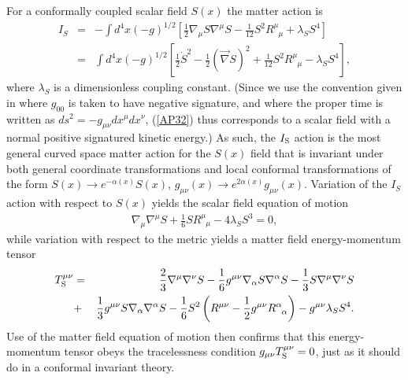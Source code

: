 \documentclass[aps]{revtex4}
\begin{document}
For a conformally coupled scalar field $S(x)$ the matter action is
%                                                                               
\begin{eqnarray}
I_S&=&-\int d^4x(-g)^{1/2}\left[\frac{1}{2}\nabla_{\mu}S
\nabla^{\mu}S-\frac{1}{12}S^2R^\mu_{\phantom         
{\mu}\mu}+\lambda_S S^4\right]
\nonumber\\
&=&\int d^4x(-g)^{1/2}\left[\frac{1}{2}\dot{S}^2-\frac{1}{2}(\vec{\nabla} S)^2
+\frac{1}{12}S^2R^\mu_{\phantom         
{\mu}\mu}-\lambda_S S^4\right],
\label{AP32}
\end{eqnarray}                                 
% 
where  $\lambda_S$ is a dimensionless coupling constant. (Since we use the convention given in  \cite{Weinberg1972} where $g_{00}$ is taken to have negative signature, and where the proper time is written as $ds^2=-g_{\mu\nu}dx^{\mu}dx^{\nu}$, (\ref{AP32}) thus corresponds to a scalar field with a normal positive signatured kinetic energy.) As such, the $I_{\rm S}$ action is the most general curved space matter action for the $S(x)$ field that is invariant under both general coordinate transformations and local conformal transformations of the form
$S(x)\rightarrow e^{-\alpha(x)}S(x)$,  $g_{\mu\nu}(x)\rightarrow e^{2\alpha(x)}g_{\mu\nu}(x)$. Variation of the $I_S$ action with respect to  $S(x)$ yields the scalar field equation of motion
%                                                                               
\begin{eqnarray}
\nabla_{\mu}\nabla^{\mu}S+\frac{1}{6}SR^\mu_{\phantom{\mu}\mu}
-4\lambda_S S^3=0,
\label{AP33}
\end{eqnarray}                                 
%                                                               
while variation with respect to the metric yields a matter field  energy-momentum tensor 
%                                                                               
\begin{eqnarray}
T_{\rm S}^{\mu \nu}&=&\frac{2}{3}\nabla^{\mu} \nabla^{\nu} S
-\frac{1}{6}g^{\mu\nu}\nabla_{\alpha}S\nabla^{\alpha}S
-\frac{1}{3}S\nabla^{\mu}\nabla^{\nu}S
\nonumber \\             
&+&\frac{1}{3}g^{\mu\nu}S\nabla_{\alpha}\nabla^{\alpha}S                           
-\frac{1}{6}S^2\left(R^{\mu\nu}
-\frac{1}{2}g^{\mu\nu}R^\alpha_{\phantom{\alpha}\alpha}\right)-g^{\mu\nu}\lambda_S S^4. 
\label{AP34}
\end{eqnarray}                                 
% 
Use of the matter field equation of motion then confirms that this energy-momentum tensor obeys the tracelessness condition $g_{\mu\nu}T_{\rm S}^{\mu\nu}=0$, just as it should do in  a conformal invariant theory.
\end{document}
